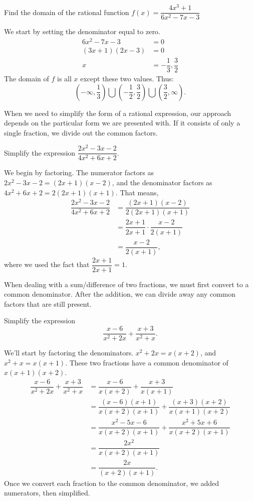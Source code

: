 \documentclass{ximera}
\begin{document}
\begin{example}
	Find the domain of the rational function $\displaystyle f(x) = \dfrac{4x^3+1}{6x^2-7x-3}$
	\begin{explanation}
		We start by setting the denominator equal to zero.
		\begin{align*}
			6x^2 - 7x - 3 &= 0\\
			(3x + 1)(2x - 3)&= 0\\
			x &= -\dfrac{1}{3} , \dfrac{3}{2}
		\end{align*}
		The domain of $f$ is all $x$ except these two values.  Thus:
		\[ \left( -\infty , \dfrac{1}{3}\right) \bigcup \left( -\dfrac{1}{2}, \dfrac{3}{2} \right) \bigcup \left( \dfrac{3}{2}, \infty \right). \]
	\end{explanation}
\end{example}


When we need to simplify the form of a rational expression, our approach depends on the particular form we are presented with.  If it consists of
only a single fraction, we divide out the common factors.
\begin{example}
	Simplify the expression $\displaystyle \dfrac{2x^2-3x-2}{4x^2+6x+2}$.
	\begin{explanation}
		We begin by factoring.  The numerator factors as $2x^2 - 3x -2 = (2x+1)(x-2)$, and the denominator factors as $4x^2+6x+2 = 2(2x+1)(x+1)$.
		That means,
		\begin{align*}
			\dfrac{2x^2-3x-2}{4x^2 + 6x + 2} &= \dfrac{(2x+1)(x-2)}{2(2x+1)(x+1)} \\
				&= \dfrac{2x+1}{2x+1} \cdot \dfrac{x-2}{2(x+1)}\\
				&= \dfrac{x-2}{2(x+1)},
		\end{align*}	
		where we used the fact that $\displaystyle \dfrac{2x+1}{2x+1} = 1$.
	\end{explanation}
\end{example}

When dealing with a sum/difference of two fractions, we must first convert to a common denominator.  After the addition,
we can divide away any common factors that are still present.
\begin{example}
	Simplify the expression \[ \dfrac{x-6}{x^2+2x} + \dfrac{x+3}{x^2+x}. \]
	\begin{explanation}
		We'll start by factoring the denominators.  $x^2+2x = x(x+2)$, and $x^2+x = x(x+1)$.
		These two fractions have a common denominator of $x(x+1)(x+2)$.
		\begin{align*}
			\dfrac{x-6}{x^2+2x} + \dfrac{x+3}{x^2+x} &= \dfrac{x-6}{x(x+2)} + \dfrac{x+3}{x(x+1)}\\
				&= \dfrac{(x-6)(x+1)}{x(x+2)(x+1)} + \dfrac{(x+3)(x+2)}{x(x+1)(x+2)}\\
				&= \dfrac{x^2-5x-6}{x(x+2)(x+1)} + \dfrac{x^2+5x+6}{x(x+2)(x+1)}\\ 
				&= \dfrac{2x^2}{x(x+2)(x+1)}\\
				&= \dfrac{2x}{(x+2)(x+1)}.
		\end{align*}
		Once we convert each fraction to the common denominator, we added numerators, then simplified.
	\end{explanation}
\end{example}
\end{document}
